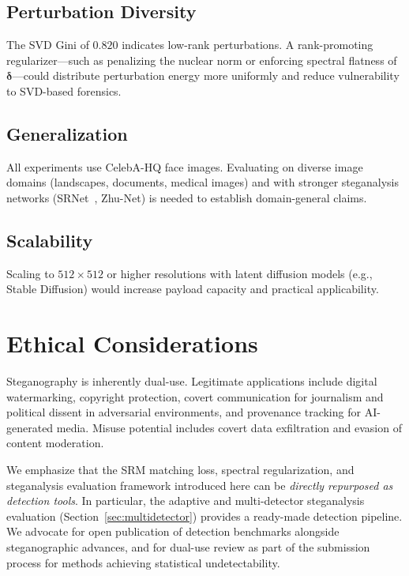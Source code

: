 \documentclass[journal]{IEEEtran}
\begin{document}
\subsection{Perturbation Diversity}
The SVD Gini of $0.820$ indicates low-rank perturbations.
A rank-promoting regularizer---such as penalizing the nuclear norm or enforcing spectral
flatness of $\bm{\delta}$---could distribute perturbation energy more uniformly and
reduce vulnerability to SVD-based forensics.

\subsection{Generalization}
All experiments use CelebA-HQ face images.
Evaluating on diverse image domains (landscapes, documents, medical images) and with
stronger steganalysis networks (SRNet~\cite{boroumand2019deep}, Zhu-Net) is needed to
establish domain-general claims.

\subsection{Scalability}
Scaling to $512\times512$ or higher resolutions with latent diffusion models
(e.g., Stable Diffusion) would increase payload capacity and practical applicability.


\section{Ethical Considerations}
\label{sec:ethics}

Steganography is inherently dual-use.
Legitimate applications include digital watermarking, copyright protection, covert
communication for journalism and political dissent in adversarial environments, and provenance
tracking for AI-generated media.
Misuse potential includes covert data exfiltration and evasion of content moderation.

We emphasize that the SRM matching loss, spectral regularization, and steganalysis evaluation
framework introduced here can be \emph{directly repurposed as detection tools}.
In particular, the adaptive and multi-detector steganalysis evaluation (Section~\ref{sec:multidetector})
provides a ready-made detection pipeline.
We advocate for open publication of detection benchmarks alongside steganographic advances,
and for dual-use review as part of the submission process for methods achieving statistical
undetectability.
\end{document}
